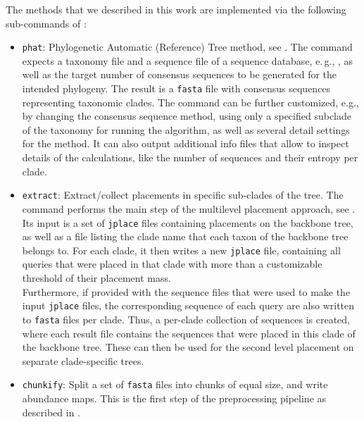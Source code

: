 The methods that we described in this work are implemented via the following sub-commands of :

\begin{itemize}
    \item \texttt{phat}: Phylogenetic Automatic (Reference) Tree method, see .
          The command expects a taxonomy file and a sequence file of a sequence database,
          e.\,g.,  \cite{Quast2013,Yilmaz2014},
          as well as the target number of consensus sequences to be generated for the intended phylogeny.
          The result is a \texttt{fasta} file with consensus sequences representing taxonomic clades.
          The command can be further customized, e.g., by changing the consensus sequence method,
          using only a specified subclade of the taxonomy for running the algorithm,
          as well as several detail settings for the method.
          It can also output additional info files that allow to inspect details of the calculations,
          like the number of sequences and their entropy per clade.
    \item \texttt{extract}: Extract/collect placements in specific sub-clades of the tree.
          The command performs the main step of the multilevel placement approach,
          see .
          Its input is a set of \texttt{jplace} files containing placements on the backbone tree,
          as well as a file listing the clade name that each taxon of the backbone tree belongs to.
          For each clade, it then writes a new \texttt{jplace} file,
          containing all queries that were placed in that clade with more than a customizable threshold
          of their placement mass.
          \\
          Furthermore, if provided with the sequence files that were used to make the input \texttt{jplace} files,
          the corresponding sequence of each query are also written to \texttt{fasta} files per clade.
          Thus, a per-clade collection of sequences is created, where each result file contains the sequences
          that were placed in this clade of the backbone tree.
          These can then be used for the second level placement on separate clade-specific trees.
    \item \texttt{chunkify}: Split a set of \texttt{fasta} files into chunks of equal size,
          and write abundance maps.
          This is the first step of the preprocessing pipeline as described in .

\end{itemize}
